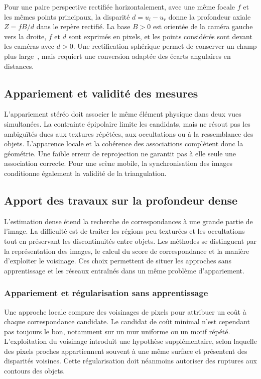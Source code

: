 \documentclass[11pt,a4paper]{article}
\begin{document}
Pour une paire perspective rectifiée horizontalement, avec une même focale $f$ et les mêmes points principaux, la disparité $d=u_l-u_r$ donne la profondeur axiale $Z=fB/d$ dans le repère rectifié. La base $B>0$ est orientée de la caméra gauche vers la droite, $f$ et $d$ sont exprimés en pixels, et les points considérés sont devant les caméras avec $d>0$. Une rectification sphérique permet de conserver un champ plus large~\cite{abraham2005}, mais requiert une conversion adaptée des écarts angulaires en distances.

\subsection{Appariement et validité des mesures}
L'appariement stéréo doit associer le même élément physique dans deux vues simultanées. La contrainte épipolaire limite les candidats, mais ne résout pas les ambiguïtés dues aux textures répétées, aux occultations ou à la ressemblance des objets. L'apparence locale et la cohérence des associations complètent donc la géométrie. Une faible erreur de reprojection ne garantit pas à elle seule une association correcte. Pour une scène mobile, la synchronisation des images conditionne également la validité de la triangulation.

\subsection{Apport des travaux sur la profondeur dense}
L'estimation dense étend la recherche de correspondances à une grande partie de l'image. La difficulté est de traiter les régions peu texturées et les occultations tout en préservant les discontinuités entre objets. Les méthodes se distinguent par la représentation des images, le calcul du score de correspondance et la manière d'exploiter le voisinage. Ces choix permettent de situer les approches sans apprentissage et les réseaux entraînés dans un même problème d'appariement.

\subsubsection{Appariement et régularisation sans apprentissage}
Une approche locale compare des voisinages de pixels pour attribuer un coût à chaque correspondance candidate. Le candidat de coût minimal n'est cependant pas toujours le bon, notamment sur un mur uniforme ou un motif répété. L'exploitation du voisinage introduit une hypothèse supplémentaire, selon laquelle des pixels proches appartiennent souvent à une même surface et présentent des disparités voisines. Cette régularisation doit néanmoins autoriser des ruptures aux contours des objets.
\end{document}
